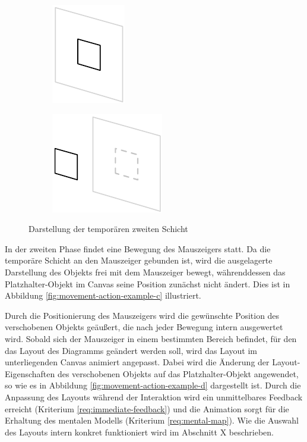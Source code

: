 \begin{figure}[hbt]
    \newcommand{\subfigurewidth}{0.35\textwidth}
    \newcommand{\graphicsscale}{1.2}
    \centering
    \begin{subfigure}{\subfigurewidth}
        \centering
        \includegraphics[scale=\graphicsscale]{resources/temporary-layer-visualization-a}
        \caption{}
    \end{subfigure}
    \begin{subfigure}{\subfigurewidth}
        \centering
        \includegraphics[scale=\graphicsscale]{resources/temporary-layer-visualization-b}
        \caption{}
    \end{subfigure}
    \caption{Darstellung der temporären zweiten Schicht}
    \label{fig:temporary-layer-visualization}
\end{figure}

In der zweiten Phase findet eine Bewegung des Mauszeigers statt. Da die temporäre Schicht an den Mauszeiger gebunden ist, wird die ausgelagerte Darstellung des Objekts frei mit dem Mauszeiger bewegt, währenddessen das Platzhalter-Objekt im Canvas seine Position zunächst nicht ändert. Dies ist in Abbildung \ref{fig:movement-action-example-c} illustriert.

Durch die Positionierung des Mauszeigers wird die gewünschte Position des verschobenen Objekts geäußert, die nach jeder Bewegung intern ausgewertet wird. Sobald sich der Mauszeiger in einem bestimmten Bereich befindet, für den das Layout des Diagramms geändert werden soll, wird das Layout im unterliegenden Canvas animiert angepasst. Dabei wird die Änderung der Layout-Eigenschaften des verschobenen Objekts auf das Platzhalter-Objekt angewendet, so wie es in Abbildung \ref{fig:movement-action-example-d} dargestellt ist. Durch die Anpassung des Layouts während der Interaktion wird ein unmittelbares Feedback erreicht (Kriterium \ref{req:immediate-feedback}) und die Animation sorgt für die Erhaltung des mentalen Modells (Kriterium \ref{req:mental-map}). Wie die Auswahl des Layouts intern konkret funktioniert wird im Abschnitt X beschrieben.

